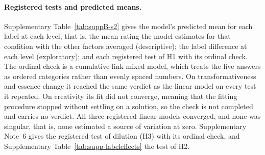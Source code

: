 \paragraph*{Registered tests and predicted means.}
Supplementary Table~\ref{tab:suppB-s2} gives the model's predicted mean for each label at each level, that is, the mean rating the model estimates for that condition with the other factors averaged (descriptive); the label difference at each level (exploratory); and each registered test of H1 with its ordinal check. The ordinal check is a cumulative-link mixed model, which treats the five answers as ordered categories rather than evenly spaced numbers. On transformativeness and essence change it reached the same verdict as the linear model on every test it repeated. On creativity its fit did not converge, meaning that the fitting procedure stopped without settling on a solution, so the check is not completed and carries no verdict. All three registered linear models converged, and none was singular, that is, none estimated a source of variation at zero. Supplementary Note~6 gives the registered test of dilution (H3) with its ordinal check, and Supplementary Table~\ref{tab:supp-labeleffects} the test of H2.



